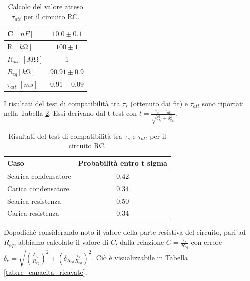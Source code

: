 \documentclass[a4paper]{article}
\begin{document}
\begin{table}[htbp] %
\centering
\begin{tabular}{|l|c|}
\hline
C $[\si{nF}]$ & $10.0 \pm 0.1$ \\ %
\hline
R $[\si{k\ohm}]$ & $100 \pm 1$ \\ %
\hline
$R_{osc}$ $[\si{M\ohm}]$ & 1\\ %
\hline
$R_{eq} [\si{k\ohm}]$ & $90.91 \pm 0.9$\\ %
\hline
$\tau_{att}$ $[\si{ms}]$ & $0.91 \pm 0.09$\\ %
\hline
\end{tabular}
\caption{Calcolo del valore atteso $\tau_{att}$ per il circuito RC.}
\label{tab:rc_tau_atteso}
\end{table}

I risultati del test di compatibilità tra $\tau_s$ (ottenuto dai fit) e $\tau_{att}$ sono riportati nella Tabella \ref{tab:rc_compatibilita}. Essi derivano dal t-test con \( t = \frac {\tau_s - \tau_{att}}{\sqrt{\delta_{\tau_s}^2+\delta_{\tau_{att}}^2}} \).

\begin{table}[htbp] %
\centering
\begin{tabular}{|l|c|}
\hline
Caso & Probabilità entro t sigma \\
\hline
Scarica condensatore & 0.42 \\
Carica condensatore & 0.34 \\
Scarica resistenza & 0.50 \\
Carica resistenza & 0.34 \\
\hline
\end{tabular}
\caption{Risultati del test di compatibilità tra $\tau_s$ e $\tau_{att}$ per il circuito RC.}
\label{tab:rc_compatibilita}
\end{table}



Dopodichè considerando noto il valore della parte resistiva del circuito, pari ad $R_{eq}$, abbiamo calcolato il valore di $C$, dalla relazione
 \(C = \frac{\tau_s}{R_{eq}}\) con errore $\delta_c = \sqrt{(\frac{\delta_{\tau_s}}{R_{eq}})^2 + (\delta_{R_{eq}}\frac{\tau_s}{R_{eq}})^2}$.
 Ciò è visualizzabile in Tabella \ref{tab:rc_capacita_ricavate}.
\end{document}
